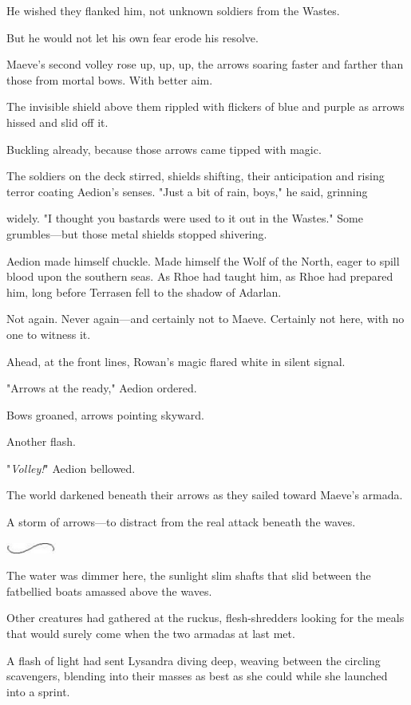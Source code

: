 He wished they flanked him, not unknown soldiers from the Wastes.

But he would not let his own fear erode his resolve.

Maeve's second volley rose up, up, up, the arrows soaring faster and farther than those from mortal bows. With better aim.

The invisible shield above them rippled with flickers of blue and purple as arrows hissed and slid off it.

Buckling already, because those arrows came tipped with magic.

The soldiers on the deck stirred, shields shifting, their anticipation and rising terror coating Aedion's senses. "Just a bit of rain, boys," he said, grinning

widely. "I thought you bastards were used to it out in the Wastes." Some grumbles---but those metal shields stopped shivering.

Aedion made himself chuckle. Made himself the Wolf of the North, eager to spill blood upon the southern seas. As Rhoe had taught him, as Rhoe had prepared him, long before Terrasen fell to the shadow of Adarlan.

Not again. Never again---and certainly not to Maeve. Certainly not here, with no one to witness it.

Ahead, at the front lines, Rowan's magic flared white in silent signal.

"Arrows at the ready," Aedion ordered.

Bows groaned, arrows pointing skyward.

Another flash.

"\emph{Volley!}" Aedion bellowed.

The world darkened beneath their arrows as they sailed toward Maeve's armada.

A storm of arrows---to distract from the real attack beneath the waves.

\includegraphics[width=0.65in,height=0.13in]{images/seperator}

The water was dimmer here, the sunlight slim shafts that slid between the fatbellied boats amassed above the waves.

Other creatures had gathered at the ruckus, flesh-shredders looking for the meals that would surely come when the two armadas at last met.

A flash of light had sent Lysandra diving deep, weaving between the circling scavengers, blending into their masses as best as she could while she launched into a sprint.

